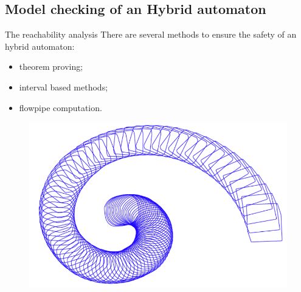 \subsection{Model checking of an Hybrid automaton}
\begin{frame}{The reachability analysis}
There are several methods to ensure the safety of an hybrid automaton:
\begin{itemize}
\item theorem proving;
\item interval based methods;
\item flowpipe computation.
\end{itemize}

\begin{figure}
\includegraphics[scale=1]{images/zono.png}
\end{figure}

\end{frame}

